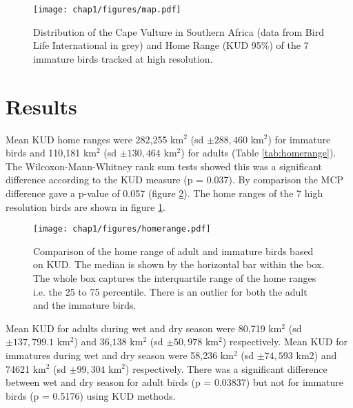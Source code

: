 \begin{figure}[H] %
	  \centering
	  \texttt{[image: chap1/figures/map.pdf]}
	    \caption[Map of Cape Vulture distribution with home ranges] %
	    {Distribution of the Cape Vulture in Southern Africa (data from Bird Life International in grey) and Home Range (KUD 95\%) of the 7 immature birds tracked at high resolution. }%
	  \label{fig:map}
	\end{figure}

\section{\uppercase{R}esults}
	Mean KUD home ranges were 282,255 km$^2$ (sd $\pm 288,460$ km$^2$) for immature birds and 110,181 km$^2$ (sd $\pm 130,464$ km$^2$) for adults (Table \ref{tab:homerange}). The Wilcoxon-Mann-Whitney rank sum tests showed this was a significant difference according to the KUD measure (p = 0.037). By comparison the MCP difference gave a p-value of 0.057 (figure \ref{fig:homerange}). The home ranges of the 7 high resolution birds are shown in figure \ref{fig:map}.

	\begin{figure}[H] %
	  \centering
	  \texttt{[image: chap1/figures/homerange.pdf]}
	    \caption[Comparison of the home range of adult and immature birds. ] %
	    {Comparison of the home range of adult and immature birds based on KUD. The median is shown by the horizontal bar within the box. The whole box captures the interquartile range of the home ranges i.e. the 25 to 75 
percentile. There is an outlier for both the adult and the immature birds.}%
	  \label{fig:homerange}
	\end{figure}


	Mean KUD for adults during wet and dry season were 80,719 km$^2$ (sd $\pm 137,799.1$ km$^2$) and 36,138 km$^2$ (sd $\pm 50,978$ km$^2$) respectively. Mean KUD for immatures during wet and dry season were 58,236 km$^2$ (sd $\pm 74,593$ km2) and 74621 km$^2$ (sd $\pm 99,304$ km$^2$) respectively. There was a significant difference between wet and dry season for adult birds (p = 0.03837) but not for immature birds (p = 0.5176) using KUD methods.

